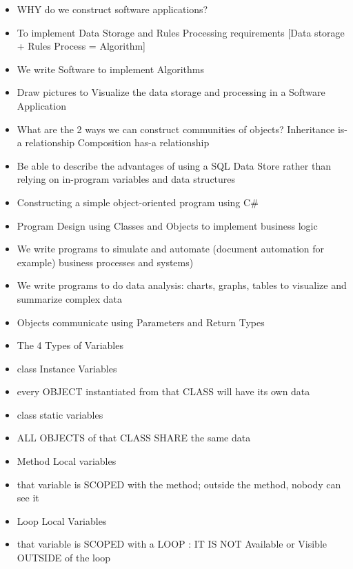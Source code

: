 \documentclass{article}
\begin{document}
\begin{itemize}[label={$\bullet$}]
    \item    WHY do we construct software applications?
    \item      To implement Data Storage and Rules Processing  requirements [Data storage + Rules Process = Algorithm]
    \item        We write Software to implement Algorithms
    \item    Draw pictures to Visualize the data storage and processing in a Software Application
    \item      What are the 2 ways we can construct communities of objects?
    \subitem        Inheritance
    \subsubitem          is-a relationship
    \subitem        Composition
    \subsubitem          has-a relationship
    \item    Be able to describe the advantages of using a SQL Data Store rather than relying on in-program variables and data structures
    \item Constructing a simple object-oriented program using C\#
    \item   Program Design using Classes and Objects to implement business logic
    \item     We write programs to simulate and automate (document automation for example) business processes and systems)
    \item     We write programs to do data analysis: charts, graphs, tables to visualize and summarize complex data
    \item   Objects communicate using Parameters and Return Types
    \item   The 4 Types of Variables
    \item     class Instance Variables
    \item       every OBJECT instantiated from that CLASS will have its own data
    \item     class static variables
    \item       ALL OBJECTS of that CLASS SHARE the same data
    \item     Method Local variables
    \item       that variable is SCOPED with the method; outside the method, nobody can see it
    \item     Loop Local Variables
    \item       that variable is SCOPED with a LOOP : IT IS NOT Available or Visible OUTSIDE of the loop

\end{itemize}
\end{document}
